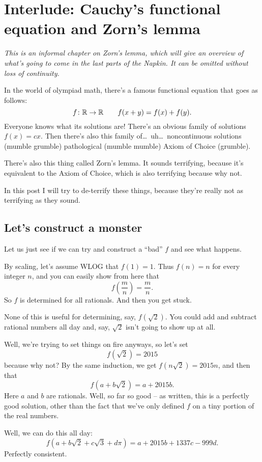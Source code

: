 \chapter{Interlude: Cauchy's functional equation and Zorn's lemma}
\label{ch:zorn}
\emph{This is an informal chapter on Zorn's lemma,
which will give an overview of what's going to come in the last parts of the Napkin.
It can be omitted without loss of continuity.}

\medskip

In the world of olympiad math, there's a famous functional equation that goes as follows:
\[ f \colon \mathbb R \to \mathbb R \qquad f(x+y) = f(x) + f(y). \]
Everyone knows what its solutions are!
There's an obvious family of solutions $f(x) = cx$.
Then there's also this family of\dots\ uh\dots\ noncontinuous solutions (mumble grumble) pathological
(mumble mumble) Axiom of Choice (grumble).

There's also this thing called Zorn's lemma. It sounds terrifying,
because it's equivalent to the Axiom of Choice, which is also terrifying because why not.

In this post I will try to de-terrify these things,
because they're really not as terrifying as they sound.

\section{Let's construct a monster}
Let us just see if we can try and construct a ``bad'' $f$ and see what happens.

By scaling, let's assume WLOG that $f(1) = 1$.
Thus $f(n) = n$ for every integer $n$, and you can easily show from here that
\[ f\left( \frac mn \right) = \frac mn. \]
So $f$ is determined for all rationals. And then you get stuck.

None of this is useful for determining, say, $f(\sqrt 2)$.
You could add and subtract rational numbers all day
and, say, $\sqrt 2$ isn't going to show up at all.

Well, we're trying to set things on fire anyways, so let's set
\[ f(\sqrt 2) = 2015 \]
because why not?
By the same induction, we get $f(n\sqrt2) = 2015n$, and then that
\[ f\left( a + b \sqrt 2 \right) = a + 2015b. \]
Here $a$ and $b$ are rationals.
Well, so far so good -- as written, this is a perfectly good solution,
other than the fact that we've only defined $f$ on a tiny portion of the real numbers.

Well, we can do this all day:
\[ f\left( a + b \sqrt 2 + c \sqrt 3 + d \pi \right) = a + 2015b + 1337c - 999d. \]
Perfectly consistent.

